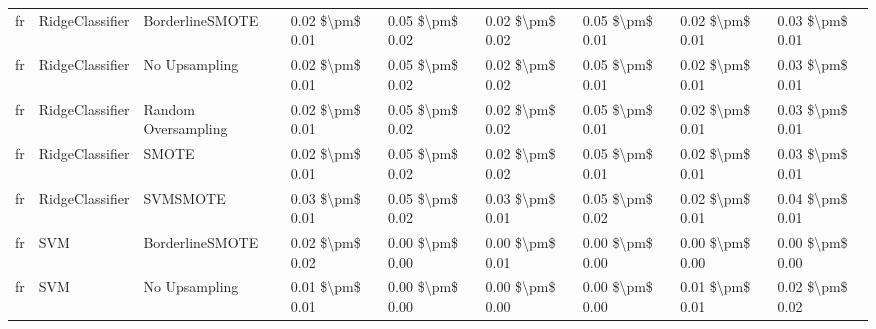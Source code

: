 \begin{tabular}{lllllllll}
      fr &                 RidgeClassifier &               BorderlineSMOTE & 0.02 \$\textbackslash pm\$ 0.01 &           0.05 \$\textbackslash pm\$ 0.02 &       0.02 \$\textbackslash pm\$ 0.02 &        0.05 \$\textbackslash pm\$ 0.01 &                         0.02 \$\textbackslash pm\$ 0.01 &     0.03 \$\textbackslash pm\$ 0.01 \\
      fr &                 RidgeClassifier &                 No Upsampling & 0.02 \$\textbackslash pm\$ 0.01 &           0.05 \$\textbackslash pm\$ 0.02 &       0.02 \$\textbackslash pm\$ 0.02 &        0.05 \$\textbackslash pm\$ 0.01 &                         0.02 \$\textbackslash pm\$ 0.01 &     0.03 \$\textbackslash pm\$ 0.01 \\
      fr &                 RidgeClassifier &           Random Oversampling & 0.02 \$\textbackslash pm\$ 0.01 &           0.05 \$\textbackslash pm\$ 0.02 &       0.02 \$\textbackslash pm\$ 0.02 &        0.05 \$\textbackslash pm\$ 0.01 &                         0.02 \$\textbackslash pm\$ 0.01 &     0.03 \$\textbackslash pm\$ 0.01 \\
      fr &                 RidgeClassifier &                         SMOTE & 0.02 \$\textbackslash pm\$ 0.01 &           0.05 \$\textbackslash pm\$ 0.02 &       0.02 \$\textbackslash pm\$ 0.02 &        0.05 \$\textbackslash pm\$ 0.01 &                         0.02 \$\textbackslash pm\$ 0.01 &     0.03 \$\textbackslash pm\$ 0.01 \\
      fr &                 RidgeClassifier &                      SVMSMOTE & 0.03 \$\textbackslash pm\$ 0.01 &           0.05 \$\textbackslash pm\$ 0.02 &       0.03 \$\textbackslash pm\$ 0.01 &        0.05 \$\textbackslash pm\$ 0.02 &                         0.02 \$\textbackslash pm\$ 0.01 &     0.04 \$\textbackslash pm\$ 0.01 \\
      fr &                             SVM &               BorderlineSMOTE & 0.02 \$\textbackslash pm\$ 0.02 &           0.00 \$\textbackslash pm\$ 0.00 &       0.00 \$\textbackslash pm\$ 0.01 &        0.00 \$\textbackslash pm\$ 0.00 &                         0.00 \$\textbackslash pm\$ 0.00 &     0.00 \$\textbackslash pm\$ 0.00 \\
      fr &                             SVM &                 No Upsampling & 0.01 \$\textbackslash pm\$ 0.01 &           0.00 \$\textbackslash pm\$ 0.00 &       0.00 \$\textbackslash pm\$ 0.00 &        0.00 \$\textbackslash pm\$ 0.00 &                         0.01 \$\textbackslash pm\$ 0.01 &     0.02 \$\textbackslash pm\$ 0.02 \\

\end{tabular}
